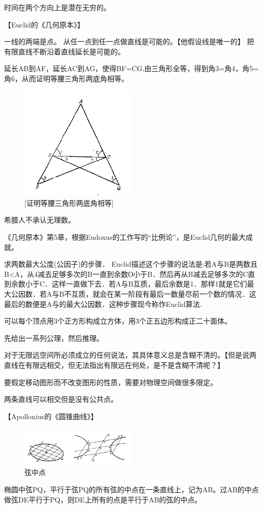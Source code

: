 \documentclass[UTF8]{../09-Mathematics}
\begin{document}
时间在两个方向上是潜在无穷的。


【Euclid的《几何原本》】

一线的两端是点。
从任一点到任一点做直线是可能的。【他假设线是唯一的】
把有限直线不断沿着直线延长是可能的。


延长AB到AF，延长AC到AG，使得BF=CG,由三角形全等，得到角3=角4，角5=角6，从而证明等腰三角形两底角相等。
\begin{figure}[h]
    \centering
    \includegraphics[width=0.5\textwidth]{./resources/古今数学思想-图4_2.png}
    \caption{[证明等腰三角形两底角相等]}
    \label{fig:6}
\end{figure}

希腊人不承认无理数。

《几何原本》第5章，根据Eudoxus的工作写的“比例论”，是Euclid几何的最大成就。


求两数最大公度(公因子)的步骤． Euclid描述这个步骤的说法是:若A与B是两数且B<A，从4减去足够多次的B一直到余数О小于B．然后再从B减去足够多次的C直到余数小于C．这样一直做下去．若A与B互质，最后余数是1．那样1就是它们最大公因数．若A与B不互质，就会在某一阶段有最后一数量尽前一个数的情况．这最后的数便是A与的最大公因数．这种步骤现今称作Euclid算法.

可以每个顶点用3个正方形构成立方体，用3个正五边形构成正二十面体。

先给出一系列公理，然后推理。

对于无限远空间所必须成立的任何说法，其具体意义总是含糊不清的。【但是说两直线在有限远相交，但无法指出有限远在何处，是不是含糊不清呢？】

要假定移动图形而不改变图形的性质，需要对物理空间做很多限定。

两条直线可以相交但是没有公共点。




【Apollonius的《圆锥曲线》】



\begin{figure}[h]
    \centering
    \includegraphics[width=0.5\textwidth]{./resources/古今数学思想-图4_21.png}
    \caption{弦中点}
    \label{fig:7}
\end{figure}
椭圆中弦PQ，平行于弦PQ的所有弦的中点在一条直线上，记为AB。过AB的中点做弦DE平行于PQ，则DE上所有的点是平行于AB的弦的中点。
\end{document}
